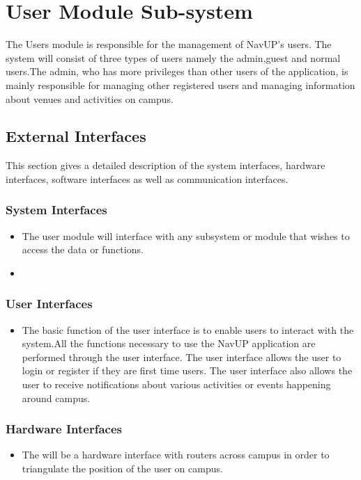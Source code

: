 

\section{User Module Sub-system}

The Users module is responsible for the management of NavUP's users. The system will consist of three types of users namely the admin,guest and normal users.The admin, who has more privileges than other users of the application, is mainly responsible for managing other registered users and managing information about venues and activities on campus.

\subsection{External Interfaces}
This section gives a detailed description of the system interfaces, hardware interfaces, software interfaces as well as communication interfaces.

	\subsubsection{System Interfaces}
		\begin{itemize}
			\item The user module will interface with any subsystem or module that wishes to access the data or               functions.  
			
			\item 
		\end{itemize}
	\subsubsection{User Interfaces }
	\begin{itemize}
	\item The basic function of the user interface is to enable users to interact with the system.All the functions necessary to use the NavUP application are performed through the user interface. The user interface allows the user to login or register if they are first time users. The user interface also allows the user to receive notifications about various activities or events happening around campus. 

	\end{itemize}
 
	\subsubsection{Hardware Interfaces }
	\begin{itemize}
	\item The will be a hardware interface with routers across campus in order to triangulate the position of the user on campus.
	\end{itemize}
